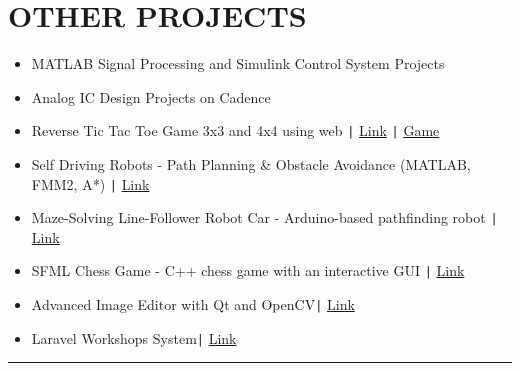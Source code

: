 \documentclass[11pt,a4paper]{article}
\begin{document}
\section*{\fontsize{14}{18}\textbf\selectfont OTHER PROJECTS}
\vspace{-0.3cm}
\begin{itemize}[noitemsep, left=0pt, itemsep=5pt]
\item MATLAB Signal Processing and Simulink Control System Projects
\item Analog IC Design Projects on Cadence
\item Reverse Tic Tac Toe Game 3x3 and 4x4 using web \texttt{|} \href{https://github.com/salah0eldin/Tic_tac_toe_AVOID_THE_X}{Link} \texttt{|} \href{https://salah0eldin.github.io/Tic_tac_toe_AVOID_THE_X/}{Game}
\item Self Driving Robots - Path Planning \& Obstacle Avoidance (MATLAB, FMM2, A*) \texttt{|} \href{https://github.com/salah0eldin/PathPLanningUsingFMM2andAStar}{Link}
\item Maze-Solving Line-Follower Robot Car - Arduino-based pathfinding robot \texttt{|} \href{https://github.com/salah0eldin/ArduinoCarLineFollowerMazeSolver-Saver}{Link}
\item SFML Chess Game - C++ chess game with an interactive GUI \texttt{|} \href{https://github.com/salah0eldin/CHESS_CPP_SFML}{Link}
\item Advanced Image Editor with Qt and OpenCV\texttt{|} {\href{https://github.com/salah0eldin/CODSOFT/tree/main/C%2B%2B/Task5%20-%20ImageProcessing/ImageEdit}{Link}}
\item Laravel Workshops System\texttt{|} {\href{https://github.com/salah0eldin/WorkshopsSystem}{Link}}
\end{itemize}
\vspace{-0.6cm}
\rule{\textwidth}{0.3pt}\\
\vspace{-0.5cm}
\centering
\end{document}
